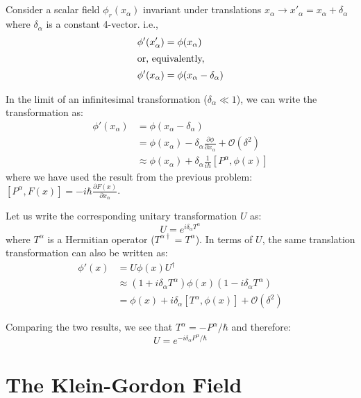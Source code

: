 \documentclass[letterpaper,12pt]{article}
\newenvironment{problem}{\subsection{}\begin{adjustwidth}{0.25in}{}\vspace{-\baselineskip}}{\end{adjustwidth}}
\newcommand{\pder}[2]{\frac{\partial #1}{\partial #2}}
\begin{document}
\begin{problem}
Consider a scalar field $\phi_r(x_\alpha)$ invariant under translations $x_\alpha \longrightarrow x'_\alpha = x_\alpha + \delta_\alpha$ where $\delta_\alpha$ is a constant 4-vector. i.e.,
\begin{align*}
	\phi'(x'_\alpha) &= \phi(x_\alpha)		\\
	\intertext{or, equivalently,} 
	\phi'(x_\alpha) &= \phi(x_\alpha - \delta_\alpha)
\end{align*}

In the limit of an infinitesimal transformation ($\delta_\alpha \ll 1$), we can write the transformation as:
\begin{align*}
	\phi'(x_\alpha) &= \phi(x_\alpha - \delta_\alpha)	\\
	&= \phi(x_\alpha) - \delta_\alpha \pder{\phi}{x_\alpha} + \mathcal{O}\left(\delta^2\right)	\\
	&\approx \phi(x_\alpha) + \delta_\alpha\frac{1}{i\hbar}\left[P^\alpha, \phi(x)\right]
\end{align*}
where we have used the result from the previous problem: $\left[P^\alpha, F(x)\right] = -i\hbar\pder{F(x)}{x_\alpha}$.

Let us write the corresponding unitary transformation $U$ as:
\begin{equation*}
U = e^{i\delta_\alpha T^\alpha}
\end{equation*}
where $T^\alpha$ is a Hermitian operator ($T^{\alpha\dagger}=T^\alpha$). In terms of $U$, the same translation transformation can also be written as:
\begin{align*}
	\phi'(x) &= U\phi(x)U^\dagger	\\
	&\approx (1+i\delta_\alpha T^\alpha) \phi(x) (1-i\delta_\alpha T^\alpha)	\\
	&= \phi(x) + i\delta_\alpha\left[T^\alpha, \phi(x)\right] + \mathcal{O}(\delta^2)
\end{align*}

Comparing the two results, we see that $T^\alpha = -P^\alpha / \hbar$ and therefore:
\begin{equation*}
	U = e^{-i\delta_\alpha P^\alpha / \hbar}		 
\end{equation*}

\end{problem}



\section{The Klein-Gordon Field}
\end{document}
